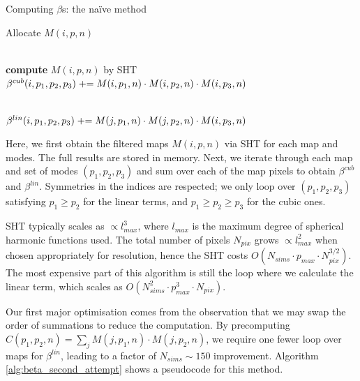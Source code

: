 \begin{algorithm}[htbp]
	\caption{Computing $\beta$s: the na\"ive method}
	\label{alg:beta_first_attempt}
	\begin{algorithmic}[1] %
		\State Allocate $M(i,p,n)$

		\\
				\State \textbf{compute} $M(i,p,n)$ by SHT
			\EndFor
		\EndFor {}
		\\
		
					\State $\beta^{cub}(i, p_1, p_2, p_3) \mathrel{+}= M(i,p_1,n) \cdot M(i,p_2,n) \cdot M(i,p_3,n)$
				\EndFor
			\EndFor
		\EndFor

		\\	
						\State $\beta^{lin}(i, p_1, p_2, p_3) \mathrel{+}= M(j,p_1,n) \cdot M(j,p_2,n) \cdot M(i,p_3,n)$
					\EndFor
				\EndFor
			\EndFor
		\EndFor

	\end{algorithmic}
\end{algorithm}

Here, we first obtain the filtered maps $M(i,p,n)$ via SHT for each map and modes. The full results are stored in memory. Next, we iterate through each map and set of modes $(p_1, p_2, p_3)$ and sum over each of the map pixels to obtain $\beta^{cub}$ and $\beta^{lin}$. Symmetries in the indices are respected; we only loop over $(p_1,p_2,p_3)$ satisfying $p_1\ge p_2$ for the linear terms, and $p_1\ge p_2\ge p_3$ for the cubic ones.

SHT typically scales as $\propto l_{max}^3$, where $l_{max}$ is the maximum degree of spherical harmonic functions used. The total number of pixels $N_{pix}$ grows $\propto l_{max}^2$ when chosen appropriately for resolution, hence the SHT costs $O(N_{sims}\cdot p_{max} \cdot N_{pix}^{3/2})$. The most expensive part of this algorithm is still the loop where we calculate the linear term, which scales as $O(N_{sims}^2 \cdot p_{max}^3 \cdot N_{pix})$.

Our first major optimisation comes from the observation that we may swap the order of summations to reduce the computation. By precomputing $C(p_1, p_2, n) = \sum_j M(j,p_1,n) \cdot M(j,p_2,n)$, we require one fewer loop over maps for $\beta^{lin}$, leading to a factor of $N_{sims}\sim150$ improvement. Algorithm \ref{alg:beta_second_attempt} shows a pseudocode for this method.

